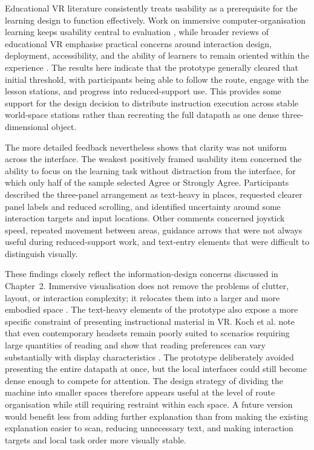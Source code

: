 Educational VR literature consistently treats usability as a prerequisite for the learning design to function effectively. Work on immersive computer-organisation learning keeps usability central to evaluation \cite{alnuaimi2025vr}, while broader reviews of educational VR emphasise practical concerns around interaction design, deployment, accessibility, and the ability of learners to remain oriented within the experience \cite{cook2019challenges,samala2025virtual}. The results here indicate that the prototype generally cleared that initial threshold, with participants being able to follow the route, engage with the lesson stations, and progress into reduced-support use. This provides some support for the design decision to distribute instruction execution across stable world-space stations rather than recreating the full datapath as one dense three-dimensional object.

The more detailed feedback nevertheless shows that clarity was not uniform across the interface. The weakest positively framed usability item concerned the ability to focus on the learning task without distraction from the interface, for which only half of the sample selected Agree or Strongly Agree. Participants described the three-panel arrangement as text-heavy in places, requested clearer panel labels and reduced scrolling, and identified uncertainty around some interaction targets and input locations. Other comments concerned joystick speed, repeated movement between areas, guidance arrows that were not always useful during reduced-support work, and text-entry elements that were difficult to distinguish visually.

These findings closely reflect the information-design concerns discussed in Chapter~2. Immersive visualisation does not remove the problems of clutter, layout, or interaction complexity; it relocates them into a larger and more embodied space \cite{korkut2023visualization}. The text-heavy elements of the prototype also expose a more specific constraint of presenting instructional material in VR. Koch et al. note that even contemporary headsets remain poorly suited to scenarios requiring large quantities of reading and show that reading preferences can vary substantially with display characteristics \cite{koch2024read}. The prototype deliberately avoided presenting the entire datapath at once, but the local interfaces could still become dense enough to compete for attention. The design strategy of dividing the machine into smaller spaces therefore appears useful at the level of route organisation while still requiring restraint within each space. A future version would benefit less from adding further explanation than from making the existing explanation easier to scan, reducing unnecessary text, and making interaction targets and local task order more visually stable.

